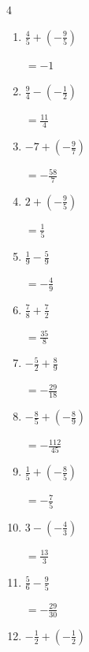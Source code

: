\begin{multicols}{4}
\begin{enumerate}
        $\displaystyle =\frac{5}{6}$

  \item $\displaystyle \frac{4}{5} + \left(-\frac{9}{5}\right)$

        $\displaystyle =-1$

  \item $\displaystyle \frac{9}{4} - \left(-\frac{1}{2}\right)$

        $\displaystyle =\frac{11}{4}$

  \item $\displaystyle -7 + \left(-\frac{9}{7}\right)$

        $\displaystyle =-\frac{58}{7}$

  \item $\displaystyle 2 + \left(-\frac{9}{5}\right)$

        $\displaystyle =\frac{1}{5}$

\columnbreak %

  \item $\displaystyle \frac{1}{9} - \frac{5}{9}$

        $\displaystyle =-\frac{4}{9}$

  \item $\displaystyle \frac{7}{8} + \frac{7}{2}$

        $\displaystyle =\frac{35}{8}$

  \item $\displaystyle -\frac{5}{2} + \frac{8}{9}$

        $\displaystyle =-\frac{29}{18}$

  \item $\displaystyle -\frac{8}{5} + \left(-\frac{8}{9}\right)$

        $\displaystyle =-\frac{112}{45}$

  \item $\displaystyle \frac{1}{5} + \left(-\frac{8}{5}\right)$

        $\displaystyle =-\frac{7}{5}$

  \item $\displaystyle 3 - \left(-\frac{4}{3}\right)$

        $\displaystyle =\frac{13}{3}$

  \item $\displaystyle \frac{5}{6} - \frac{9}{5}$

        $\displaystyle =-\frac{29}{30}$

  \item $\displaystyle -\frac{1}{2} + \left(-\frac{1}{2}\right)$


\end{enumerate}
\end{multicols}
